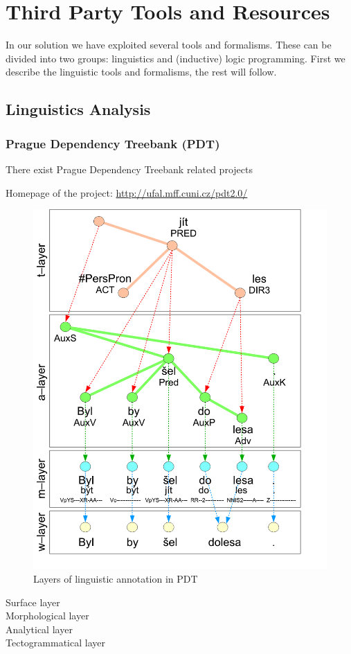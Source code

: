 \chapter{Third Party Tools and Resources}

\graphicspath{{../img/ch30/}}


In our solution we have exploited several tools and formalisms. These can be divided into two groups: linguistics and (inductive) logic programming. First we describe the linguistic tools and formalisms, the rest will follow.

\section{Linguistics Analysis} \label{sec:ch30_ling_tools}


\subsection{Prague Dependency Treebank (PDT)}
There exist  
Prague Dependency Treebank related projects   

Homepage of the project: \url{http://ufal.mff.cuni.cz/pdt2.0/}


\begin{figure}
\centerline{\includegraphics[width=0.6\hsize]{PDT_layers}}
\caption{Layers of linguistic annotation in PDT}
\label{fig:ch30_layers}
\end{figure}


\begin{description}
	\item[Surface layer]
	\item[Morphological layer]
	\item[Analytical layer]
	\item[Tectogrammatical layer]
\end{description}


